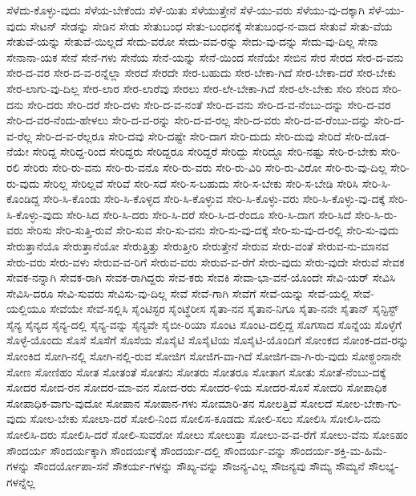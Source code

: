 {ಸೆಳೆದು-ಕೊಳ್ಳು-ವುದು
ಸೆಳೆಯ-ಬೇಕೆಂದು
ಸೆಳೆ-ಯಿತು
ಸೆಳೆಯುತ್ತೇನೆ
ಸೆಳೆ-ಯು-ವರು
ಸೆಳೆಯು-ವು-ದಕ್ಕಾಗಿ
ಸೆಳೆ-ಯು-ವುದು
ಸೇಟನ್
ಸೇಡನ್ನು
ಸೇಡಿನ
ಸೇಡು
ಸೇತುಬಂಧ
ಸೇತು-ಬಂಧನಕ್ಕೆ
ಸೇತುಬಂಧ-ನ-ವಾದ
ಸೇತುವೆ
ಸೇತು-ವೆಯ
ಸೇತುವೆ-ಯನ್ನು
ಸೇತುವೆ-ಯಿಲ್ಲದೆ
ಸೇದು-ವರೋ
ಸೇದು-ವವ-ರನ್ನು
ಸೇದು-ವು-ದನ್ನು
ಸೇದು-ವು-ದಿಲ್ಲ
ಸೇನಾ
ಸೇನಾನಾ-ಯಕ
ಸೇನೆ
ಸೇನೆ-ಗಳು
ಸೇನೆಯ
ಸೇನೆ-ಯನ್ನು
ಸೇನೆ-ಯಿಂದ
ಸೇನೆಯೇ
ಸೇಬಿನ
ಸೇರ
ಸೇರದ
ಸೇರ-ದ-ವನು
ಸೇರ-ದ-ವರ
ಸೇರ-ದ-ವ-ರನ್ನೆಲ್ಲಾ
ಸೇರದೆ
ಸೇರದೇ
ಸೇರ-ಬಹುದು
ಸೇರ-ಬೇಕಾ-ಗಿದೆ
ಸೇರ-ಬೇಕಾ-ದರೆ
ಸೇರ-ಬೇಕು
ಸೇರ-ಲಾಗು-ವು-ದಿಲ್ಲ
ಸೇರ-ಲಾರ
ಸೇರ-ಲಾರೆವು
ಸೇರಲು
ಸೇರ-ಲೇ-ಬೇಕಾ-ಗಿದೆ
ಸೇರ-ಲೇ-ಬೇಕು
ಸೇರಿ
ಸೇರಿದ
ಸೇರಿ-ದನು
ಸೇರಿ-ದರು
ಸೇರಿ-ದರೆ
ಸೇರಿ-ದಳು
ಸೇರಿ-ದ-ವ-ನಂತೆ
ಸೇರಿ-ದ-ವನು
ಸೇರಿ-ದ-ವ-ನೆಂಬು-ದನ್ನು
ಸೇರಿ-ದ-ವರ
ಸೇರಿ-ದ-ವರ-ನೆಂದು-ಹೇಳಲು
ಸೇರಿ-ದ-ವ-ರನ್ನು
ಸೇರಿ-ದ-ವ-ರಲ್ಲ
ಸೇರಿ-ದ-ವರು
ಸೇರಿ-ದ-ವ-ರೆಂಬು-ದನ್ನು
ಸೇರಿ-ದ-ವ-ರೆಲ್ಲ
ಸೇರಿ-ದ-ವ-ರೆಲ್ಲರೂ
ಸೇರಿ-ದವು
ಸೇರಿ-ದಷ್ಟೇ
ಸೇರಿ-ದಾಗ
ಸೇರಿ-ದುದು
ಸೇರಿ-ದುವು
ಸೇರಿದೆ
ಸೇರಿ-ದೊಡ-ನೆಯೇ
ಸೇರಿದ್ದ
ಸೇರಿದ್ದ-ರಿಂದ
ಸೇರಿದ್ದರು
ಸೇರಿದ್ದರೂ
ಸೇರಿದ್ದರೆ
ಸೇರಿದ್ದು
ಸೇರಿದ್ದೂ
ಸೇರಿ-ನಷ್ಟು
ಸೇರಿ-ರ-ಬೇಕು
ಸೇರಿ-ರಲಿ
ಸೇರಿರು
ಸೇರಿ-ರು-ವನು
ಸೇರಿ-ರು-ವನೊ
ಸೇರಿ-ರು-ವರು
ಸೇರಿ-ರು-ವಿರಿ
ಸೇರಿ-ರು-ವಿರೋ
ಸೇರಿ-ರು-ವು-ದಿಲ್ಲ
ಸೇರಿ-ರು-ವುದು
ಸೇರಿಲ್ಲ
ಸೇರಿಲ್ಲವೆ
ಸೇರಿವೆ
ಸೇರಿ-ಸದೆ
ಸೇರಿ-ಸ-ಬಹುದು
ಸೇರಿ-ಸ-ಬೇಕು
ಸೇರಿ-ಸ-ಬೇಡಿ
ಸೇರಿಸಿ
ಸೇರಿ-ಸಿ-ಕೊಂಡಿದ್ದ
ಸೇರಿ-ಸಿ-ಕೊಂಡು
ಸೇರಿ-ಸಿ-ಕೊಳ್ಳದ
ಸೇರಿ-ಸಿ-ಕೊಳ್ಳುವ
ಸೇರಿ-ಸಿ-ಕೊಳ್ಳು-ವರು
ಸೇರಿ-ಸಿ-ಕೊಳ್ಳು-ವು-ದಕ್ಕೆ
ಸೇರಿ-ಸಿ-ಕೊಳ್ಳು-ವುದು
ಸೇರಿ-ಸಿದ
ಸೇರಿ-ಸಿ-ದರು
ಸೇರಿ-ಸಿ-ದರೆ
ಸೇರಿ-ಸಿ-ದ-ರೆಂದೂ
ಸೇರಿ-ಸಿ-ದಾಗ
ಸೇರಿ-ಸಿದೆ
ಸೇರಿ-ಸಿ-ರು-ವರು
ಸೇರಿಸು
ಸೇರಿ-ಸುತ್ತಿ-ರುವೆ
ಸೇರಿ-ಸುವ
ಸೇರಿ-ಸು-ವನು
ಸೇರಿ-ಸು-ವು-ದಕ್ಕೆ
ಸೇರಿ-ಸು-ವು-ದ-ರಲ್ಲಿ
ಸೇರಿ-ಸು-ವುದು
ಸೇರುತ್ತಾನೆಯೊ
ಸೇರುತ್ತಾನೆಯೋ
ಸೇರುತ್ತಿತ್ತು
ಸೇರುತ್ತೀರಿ
ಸೇರುತ್ತೇನೆ
ಸೇರುವ
ಸೇರು-ವಂತೆ
ಸೇರುವ-ನು-ಮಾನವ
ಸೇರು-ವರು
ಸೇರು-ವಳು
ಸೇರುವ-ವ-ರಿಗೆ
ಸೇರುವ-ವರು
ಸೇರುವ-ವ-ರೆಗೆ
ಸೇರು-ವುದು
ಸೇರು-ವುದೇ
ಸೇರುವೆ
ಸೇವಕ
ಸೇವಕ-ನನ್ನಾಗಿ
ಸೇವಕ-ರಾಗಿ
ಸೇವಕ-ರಾಗಿದ್ದರು
ಸೇವ-ಕರು
ಸೇವಕಿ
ಸೇವಾ-ಭಾ-ವನೆ-ಯೊಂದೇ
ಸೇವಿ-ಯರ್
ಸೇವಿಸಿ
ಸೇವಿಸಿ-ದರೂ
ಸೇವಿ-ಸುವರು
ಸೇವಿಸು-ವು-ದಿಲ್ಲ
ಸೇವೆ
ಸೇವೆ-ಗಾಗಿ
ಸೇವೆಗೆ
ಸೇವೆ-ಯನ್ನು
ಸೇವೆ-ಯಲ್ಲಿ
ಸೇವೆ-ಯಲ್ಲಿಯೂ
ಸೇವೆಯೇ
ಸೇವೆ-ಸಲ್ಲಿಸಿ
ಸೈಂಟಿಸ್ಟರ
ಸೈಂಟ್ಥೆರೀಸ
ಸೈತಾ-ನನ
ಸೈತಾನ-ನಿಗೂ
ಸೈತಾ-ನನೇ
ಸೈತಾನ್
ಸೈನ್ಟಿಸ್ಟ್
ಸೈನ್ಯ
ಸೈನ್ಯದ
ಸೈನ್ಯ-ದಲ್ಲಿ
ಸೈನ್ಯ-ವನ್ನು
ಸೈನ್ಯವೇ
ಸೈಬೀ-ರಿಯಾ
ಸೊಂಟ
ಸೊಂಟ-ದಲ್ಲಿದ್ದ
ಸೊಗಸಾದ
ಸೊನ್ನೆಯ
ಸೊಳ್ಳೆಗೆ
ಸೊಳ್ಳೆ-ಯೊಂದು
ಸೊಸೆ
ಸೊಸೆಗೆ
ಸೊಸೆಯ
ಸೊಸೈಟಿ
ಸೊಸೈಟಿಯ
ಸೊಸೈಟಿ-ಯೊಂದಿಗೆ
ಸೋಂಕದ
ಸೋಂಕ-ದವ-ರನ್ನು
ಸೋಂಕಿದ
ಸೋಗಿ-ನಲ್ಲಿ
ಸೋಗಿ-ನಲ್ಲಿ-ರುವ
ಸೋಜಿಗ
ಸೋಜಿಗ-ವಾ-ಗಿದೆ
ಸೋಜಿಗ-ವಾ-ಗಿ-ರು-ವುದು
ಸೋಠ್ಹಂನಾನೇ
ಸೋಣ
ಸೋಣಿಹಂ
ಸೋತ
ಸೋತಂತೆ
ಸೋತನು
ಸೋತರು
ಸೋತರೂ
ಸೋತಾಗ
ಸೋತು
ಸೋತೆ-ನೆಂಬು-ದಕ್ಕೆ
ಸೋದರ
ಸೋದ-ರನ
ಸೋದರ-ಮಾ-ವನ
ಸೋದ-ರರು
ಸೋದರ-ಳಿಯ
ಸೋದರ-ಸೊಸೆ
ಸೋದರಿ
ಸೋಪಾಧಿಕ
ಸೋಪಾಧಿಕ-ವಾಗು-ವುದೋ
ಸೋಪಾನ
ಸೋಪಾನ-ಗಳು
ಸೋಮಾರಿ-ತನ
ಸೋಲತ್ತಿವೆ
ಸೋಲದೆ
ಸೋಲ-ಬೇಕಾ-ಗು-ವುದು
ಸೋಲ-ಬೇಕು
ಸೋಲಾ-ದರೆ
ಸೋಲಿ-ನಿಂದ
ಸೋಲಿಸ-ಕೂಡದು
ಸೋಲಿ-ಸಲು
ಸೋಲಿಸಿ
ಸೋಲಿಸಿ-ದನು
ಸೋಲಿಸಿ-ದರು
ಸೋಲಿಸಿ-ದರೆ
ಸೋಲಿ-ಸುವರೋ
ಸೋಲು
ಸೋಲುತ್ತಾ
ಸೋಲು-ವ-ವ-ರೆಗೆ
ಸೋಲು-ವೆನು
ಸೋಽಹಂ
ಸೌಂದರ್ಯ
ಸೌಂದರ್ಯಕ್ಕಾಗಿ
ಸೌಂದರ್ಯಕ್ಕೆ
ಸೌಂದರ್ಯ-ದಲ್ಲಿ
ಸೌಂದರ್ಯ-ವನ್ನು
ಸೌಂದರ್ಯ-ಶಕ್ತಿ-ಮ-ಹಿಮೆ-ಗಳನ್ನು
ಸೌಂದರ್ಯೋಪಾ-ಸನೆ
ಸೌಕರ್ಯ-ಗಳನ್ನು
ಸೌಖ್ಯ-ವನ್ನು
ಸೌಜನ್ಯ-ವಿಲ್ಲ
ಸೌಜನ್ಯವು
ಸೌಮ್ಯ
ಸೌಮ್ಯನೆ
ಸೌಲಭ್ಯ-ಗಳನ್ನೆಲ್ಲ
}
